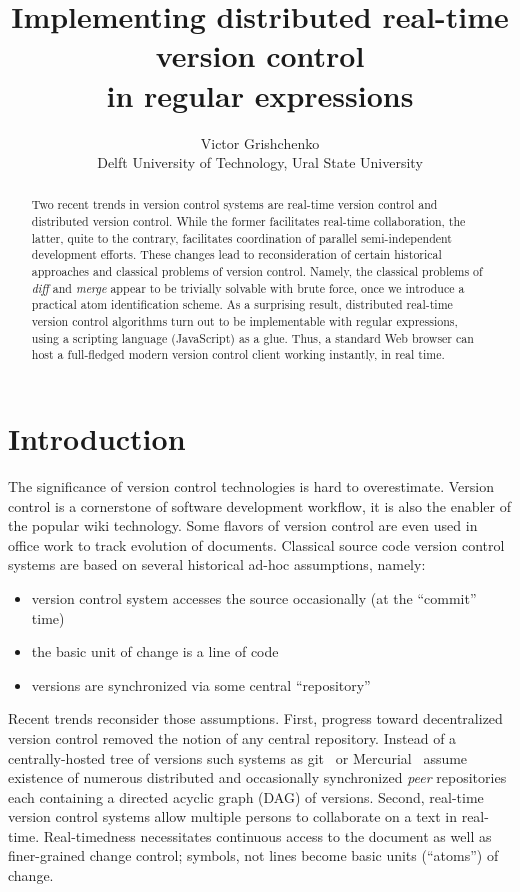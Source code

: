 \documentclass[twocolumn]{article}
\date{}
\begin{document}
\title{ Implementing distributed real-time version control \\in regular expressions }

\author{Victor Grishchenko \\ \small Delft University of Technology, Ural State University }

\maketitle

\begin{abstract}
Two recent trends in version control systems are real-time version control and distributed version control. While the former facilitates real-time collaboration, the latter, quite to the contrary, facilitates coordination of parallel semi-independent development efforts. These changes lead to reconsideration of certain historical approaches and classical problems of version control.
Namely, the classical problems of \emph{diff} and \emph{merge} appear to be trivially solvable with brute force, once we introduce a practical atom identification scheme. As a surprising result, distributed real-time version control algorithms turn out to be implementable with regular expressions, using a scripting language (JavaScript) as a glue. Thus, a standard Web browser can host a full-fledged modern version control client working instantly, in real time.
\end{abstract}


\section{Introduction}

The significance of version control technologies is hard to overestimate.
Version control is a cornerstone of software development workflow, it is also the enabler of the popular wiki technology. Some flavors of version control are even used in office work to track evolution of documents.
Classical source code version control systems are based on several historical ad-hoc assumptions, namely:
\begin{itemize}
\item version control system accesses the source occasionally (at the ``commit'' time)
\item the basic unit of change is a line of code
\item versions are synchronized via some central ``repository''
\end{itemize}
Recent trends reconsider those assumptions.
First, progress toward decentralized version control removed the notion of any central repository. Instead of a centrally-hosted tree of versions such systems as git~\cite{git} or Mercurial~\cite{mercurial} assume existence of numerous distributed and occasionally synchronized \emph{peer} repositories each containing a directed acyclic graph (DAG) of versions.
Second, real-time version control systems allow multiple persons to collaborate on a text in real-time. Real-timedness necessitates continuous access to the document as well as finer-grained change control;  symbols, not lines become basic units (``atoms'') of change.
\end{document}
